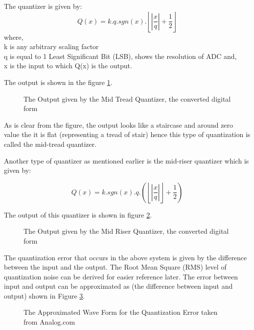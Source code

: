 \documentclass[colorlinks=true,pdfstartview=FitV,linkcolor=blue,
            citecolor=red,urlcolor=magenta]{ligodoc}
\begin{document}
 The quantizer is given by:
\begin{equation}
Q(x)=k.q.sgn(x).\left\lfloor\left|\frac{x}{q}\right|+\frac{1}{2}\right\rfloor
\end{equation}
 where,\\ k is any arbitrary scaling factor\\
 q is equal to 1 Least Significant Bit (LSB), shows the resolution of ADC
 and, \\
 x is the input to which Q(x) is the output.
 
   
The output is shown in the figure \ref{tread}.
\begin{figure}[htbp]
 
  \centering
  
  \caption{The Output given by the Mid Tread Quantizer, the converted digital form}
  \label{tread}
\end{figure}

As is clear from the figure, the output looks like a staircase and around zero value the it is flat (representing a tread of stair) hence this type of quantization is called the mid-tread quantizer.

Another type of quantizer \cite{Wikipedia} as mentioned earlier is the mid-riser quantizer which is given by:

\begin{equation}
Q(x)=k.sgn(x).q.\left(\left\lfloor\left|\frac{x}{q}\right|\right\rfloor + \frac{1}{2} \right)
\end{equation}

The output of this quantizer is shown in figure \ref{rising}.
\begin{figure}[htbp]
 \centering
 

 \caption{The Output given by the Mid Riser Quantizer, the converted digital form}
 \label{rising}
\end{figure}

The quantization error that occurs in the above system is given by the difference between the input and the output. The Root Mean Square (RMS) level of quantization noise can be derived for easier reference later.
The error between input and output can be approximated as (the difference between input and output) shown in Figure \ref{errorp}.

 \begin{figure}[htbp]
 
  \centering
  

  \caption{The Approximated Wave Form for the Quantization Error taken from Analog.com}
   \label{errorp}
\end{figure}
\end{document}
